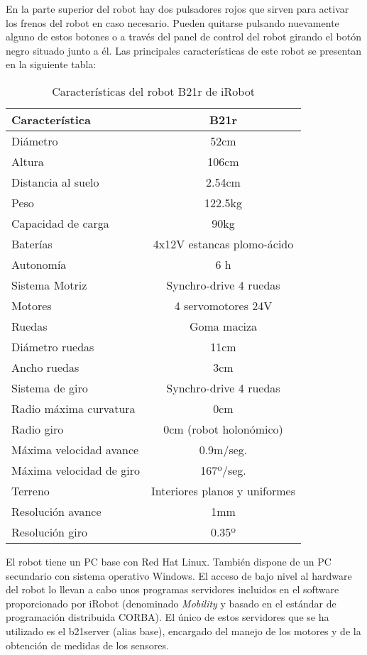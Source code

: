 En la parte superior del robot hay dos pulsadores rojos que sirven para activar los frenos del robot en caso necesario. Pueden quitarse pulsando nuevamente alguno de estos botones o a través del panel de control del robot girando el botón negro situado junto a él.
\clearpage
Las principales características de este robot se presentan en la siguiente tabla:
\begin{table}[h]
\begin{center}
\begin{tabular}{|l|c|} \hline
Característica & B21r\\
\hline
\hline
Diámetro & 52cm\\
\hline
Altura & 106cm\\
\hline
Distancia al suelo & 2.54cm\\
\hline
Peso & 122.5kg\\
\hline
Capacidad de carga & 90kg\\
\hline
Baterías & 4x12V estancas plomo-ácido\\
\hline
\hline
Autonomía & 6 h\\
\hline
Sistema Motriz & Synchro-drive 4 ruedas\\
\hline
Motores & 4 servomotores 24V\\
\hline
Ruedas & Goma maciza\\
\hline
\hline
Diámetro ruedas & 11cm\\
\hline
Ancho ruedas & 3cm\\
\hline
Sistema de giro & Synchro-drive 4 ruedas\\
\hline
Radio máxima curvatura & 0cm\\
\hline
Radio giro & 0cm (robot holonómico)\\
\hline
\hline
Máxima velocidad avance & 0.9m/seg.\\
\hline
Máxima velocidad de giro & 167º/seg.\\
\hline
Terreno & Interiores planos y uniformes\\
\hline
Resolución avance & 1mm\\
\hline
Resolución giro & 0.35º\\
\hline
\end{tabular}
\end{center}
\caption{Características del robot B21r de iRobot}
\end{table}

El robot tiene un PC base con Red Hat Linux. También dispone de un PC secundario con sistema operativo Windows. El acceso de bajo nivel al hardware del robot lo llevan a cabo unos programas servidores incluidos en el software proporcionado por iRobot (denominado \emph{Mobility} y basado en el estándar de programación distribuida CORBA). El único de estos servidores que se ha utilizado es el b21server (alias base), encargado del manejo de los motores y de la obtención de medidas de los sensores.

